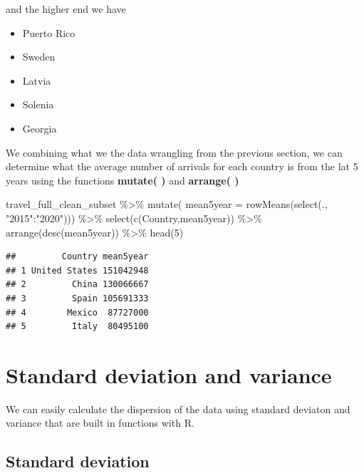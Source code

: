 \documentclass[
]{book}
\newenvironment{Shaded}{\begin{snugshade}}{\end{snugshade}}
\newcommand{\AttributeTok}[1]{\textcolor[rgb]{0.77,0.63,0.00}{#1}}
\newcommand{\DecValTok}[1]{\textcolor[rgb]{0.00,0.00,0.81}{#1}}
\newcommand{\FunctionTok}[1]{\textcolor[rgb]{0.00,0.00,0.00}{#1}}
\newcommand{\NormalTok}[1]{#1}
\newcommand{\SpecialCharTok}[1]{\textcolor[rgb]{0.00,0.00,0.00}{#1}}
\newcommand{\StringTok}[1]{\textcolor[rgb]{0.31,0.60,0.02}{#1}}
\begin{document}
and the higher end we have

\begin{itemize}
\item
  Puerto Rico
\item
  Sweden
\item
  Latvia
\item
  Solenia
\item
  Georgia
\end{itemize}

We combining what we the data wrangling from the previous section, we can determine what the average number of arrivals for each country is from the lat 5 years using the functions \textbf{mutate( )} and \textbf{arrange( )}

\begin{Shaded}
\begin{Highlighting}[]
\NormalTok{travel\_full\_clean\_subset }\SpecialCharTok{\%\textgreater{}\%}
  \FunctionTok{mutate}\NormalTok{(}
    \AttributeTok{mean5year =} \FunctionTok{rowMeans}\NormalTok{(}\FunctionTok{select}\NormalTok{(., }\StringTok{"2015"}\SpecialCharTok{:}\StringTok{"2020"}\NormalTok{))) }\SpecialCharTok{\%\textgreater{}\%}
  \FunctionTok{select}\NormalTok{(}\FunctionTok{c}\NormalTok{(Country,mean5year)) }\SpecialCharTok{\%\textgreater{}\%}
  \FunctionTok{arrange}\NormalTok{(}\FunctionTok{desc}\NormalTok{(mean5year)) }\SpecialCharTok{\%\textgreater{}\%}
  \FunctionTok{head}\NormalTok{(}\DecValTok{5}\NormalTok{)}
\end{Highlighting}
\end{Shaded}

\begin{verbatim}
##         Country mean5year
## 1 United States 151042948
## 2         China 130066667
## 3         Spain 105691333
## 4        Mexico  87727000
## 5         Italy  80495100
\end{verbatim}

\hypertarget{standard-deviation-and-variance}{%
\section{Standard deviation and variance}\label{standard-deviation-and-variance}}

We can easily calculate the dispersion of the data using standard deviaton and variance that are built in functions with R.

\hypertarget{standard-deviation}{%
\subsection{Standard deviation}\label{standard-deviation}}
\end{document}
